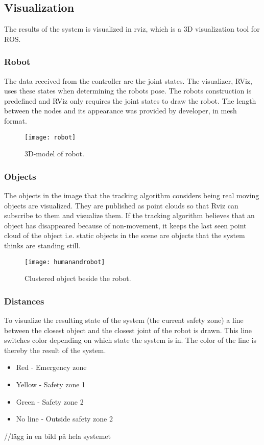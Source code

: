 \subsection{Visualization}

The results of the system is visualized in rviz, which is a 3D visualization tool for ROS. 

\subsubsection{Robot}
The data received from the controller are the joint states.
The visualizer, RViz, uses these states when determining the robots pose.
The robots construction is predefined and RViz only requires the joint states to draw the robot.
The length between the nodes and its appearance was provided by developer, in mesh format.

\begin{figure}[H]
\begin{center}
\texttt{[image: robot]}
\caption{3D-model of robot.}

\end{center}
\end{figure}

\subsubsection{Objects}
The objects in the image that the tracking algorithm considers being real moving objects are visualized. They are published as point clouds so that Rviz can subscribe to them and visualize them. If the tracking algorithm believes that an object has disappeared because of non-movement, it keeps the last seen point cloud of the object i.e. static objects in the scene are objects that the system thinks are standing still. 

\begin{figure}[H]
\begin{center}
\texttt{[image: humanandrobot]}
\caption{Clustered object beside the robot.}

\end{center}
\end{figure}


\subsubsection{Distances}
To visualize the resulting state of the system (the current safety zone) a line between the closest object and the closest joint of the robot is drawn. This line switches color depending on which state the system is in. The color of the line is thereby the result of the system. 

\begin{itemize}
  \item Red - Emergency zone
  \item Yellow - Safety zone 1 
  \item Green - Safety zone 2
  \item No line - Outside safety zone 2 
\end{itemize}

//lägg in en bild på hela systemet


